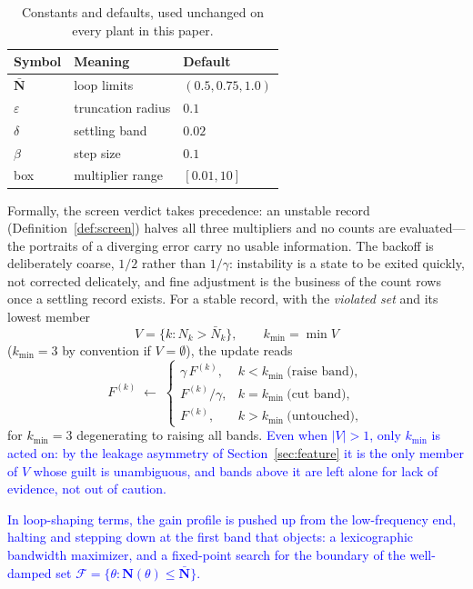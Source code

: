 \documentclass[final,3p,times,twocolumn]{elsarticle}
\newcommand{\rev}[1]{\textcolor{blue}{#1}}  %
\begin{document}
\begin{table}[h]
\centering
\caption{Constants and defaults, used unchanged on every plant in this
paper.}
\label{tab:defaults}
\begin{tabular}{lll}
\toprule
Symbol & Meaning & Default \\
\midrule
$\bar{\mathbf N}$ & loop limits & $(0.5, 0.75, 1.0)$ \\
$\varepsilon$ & truncation radius & $0.1$ \\
$\delta$ & settling band & $0.02$ \\
$\beta$ & step size & $0.1$ \\
box & multiplier range & $[0.01, 10]$ \\
\bottomrule
\end{tabular}
\end{table}

Formally, the screen verdict takes precedence: an unstable record
(Definition~\ref{def:screen}) halves all three multipliers and no counts
are evaluated---the portraits of a diverging error carry no usable
information. The backoff is deliberately coarse, $1/2$ rather than
$1/\gamma$: instability is a state to be exited quickly, not corrected
delicately, and fine adjustment is the business of the count rows once a
settling record exists. For a stable record, with the \emph{violated set} and its lowest member
\begin{equation}
V = \{k : N_k > \bar N_k\}, \qquad k_{\min} = \min V
\end{equation}
($k_{\min} = 3$ by convention if $V = \emptyset$), the update reads
\begin{equation}
F^{(k)} \;\leftarrow\;
\begin{cases}
\gamma\, F^{(k)}, & k < k_{\min} \ \text{(raise band)},\\[1mm]
F^{(k)}/\gamma, & k = k_{\min} \ \text{(cut band)},\\[1mm]
F^{(k)}, & k > k_{\min} \ \text{(untouched)},
\end{cases}
\label{eq:triangular}
\end{equation}
for $k_{\min} = 3$ degenerating to raising all bands. \rev{Even when
$|V| > 1$, only $k_{\min}$ is acted on: by the leakage asymmetry of
Section~\ref{sec:feature} it is the only member of $V$ whose guilt is
unambiguous, and bands above it are left alone for lack of evidence, not
out of caution.}

\rev{In loop-shaping terms, the gain profile is pushed up from the
low-frequency end, halting and stepping down at the first band that
objects: a lexicographic bandwidth maximizer, and a fixed-point search
for the boundary of the well-damped set
$\mathcal F = \{\theta : \mathbf N(\theta) \le \bar{\mathbf N}\}$.}
\end{document}
